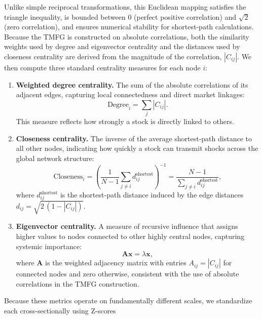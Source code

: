 \documentclass[fleqn]{rbfin}
\begin{document}
\noindent Unlike simple reciprocal transformations, this Euclidean mapping satisfies the triangle inequality, is bounded between $0$ (perfect positive correlation) and $\sqrt{2}$ (zero correlation), and ensures numerical stability for shortest-path calculations. Because the TMFG is constructed on absolute correlations, both the similarity weights used by degree and eigenvector centrality and the distances used by closeness centrality are derived from the magnitude of the correlation, $|C_{ij}|$. We then compute three standard centrality measures for each node $i$:

\begin{enumerate}
    \item \textbf{Weighted degree centrality.}  
    The sum of the absolute correlations of its adjacent edges, capturing local connectedness and direct market linkages:
    \begin{equation}
    \text{Degree}_i = \sum_{j} |C_{ij}|.
    \end{equation}
    This measure reflects how strongly a stock is directly linked to others.

    \item \textbf{Closeness centrality.}  
    The inverse of the average shortest-path distance to all other nodes, indicating how quickly a stock can transmit shocks across the global network structure:
    \begin{equation}
    \text{Closeness}_i = \left( \frac{1}{N-1} \sum_{j \neq i} d_{ij}^{\text{shortest}} \right)^{-1} = \frac{N-1}{\sum_{j \neq i} d_{ij}^{\text{shortest}}},
    \end{equation}
    where $d_{ij}^{\text{shortest}}$ is the shortest-path distance induced by the edge distances $d_{ij}=\sqrt{2\,(1-|C_{ij}|)}$.

    \item \textbf{Eigenvector centrality.}  
    A measure of recursive influence that assigns higher values to nodes connected to other highly central nodes, capturing systemic importance:
    \begin{equation}
    \mathbf{A}\mathbf{x} = \lambda \mathbf{x},
    \end{equation}
    where $\mathbf{A}$ is the weighted adjacency matrix with entries $A_{ij}=|C_{ij}|$ for connected nodes and zero otherwise, consistent with the use of absolute correlations in the TMFG construction.
\end{enumerate}

Because these metrics operate on fundamentally different scales, we standardize each cross-sectionally using Z-scores
\end{document}

